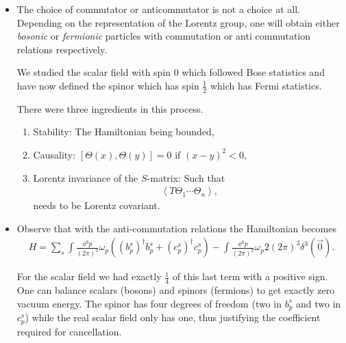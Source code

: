 \begin{itemize}
    \item The choice of commutator or anticommutator is not a choice at all. Depending on the representation of the Lorentz group, one will obtain either \textit{bosonic} or \textit{fermionic} particles with commutation or anti commutation relations respectively.

        We studied the scalar field with spin $0$ which followed Bose statistics and have now defined the spinor which has spin $\frac{1}{2}$ which has Fermi statistics.
        
        There were three ingredients in this process.
        \begin{enumerate}[label=\alph*)]
            \item Stability: The Hamiltonian being bounded,
            \item Causality: $\left[ \Theta \left( x \right) , \Theta \left( y \right)   \right] = 0$ if $\left( x- y \right)^2 < 0$,
            \item Lorentz invariance of the $S$-matrix: Such that 
                \begin{align}
                    \left<T \Theta_1 \cdots \Theta_n \right>
                ,\end{align}
                needs to be Lorentz covariant.
        \end{enumerate}
    \item Observe that with the anti-commutation relations the Hamiltonian becomes
        \begin{align}
            H = \sum_{s}^{} \int \frac{\dd{^3p}}{\left( 2\pi\right)^3} \omega_p \left( \left( b_p^{s} \right)^{\dag} b_p^{s} + \left( c_p^{s} \right)^{\dag} c^{s}_p \right)  - \int \frac{\dd{^3p}}{\left( 2\pi\right)^3} \omega_p 2 \left( 2\pi \right)^3 \delta^{3}\left( \vec{0} \right) 
        .\end{align}

        For the scalar field we had exactly $\frac{1}{4}$ of this last term with a positive sign. One can balance scalars (bosons) and spinors (fermions) to get exactly zero vacuum energy. The spinor has four degrees of freedom (two in $b^{s}_p$ and two in $c^{s}_p$) while the real scalar field only has one, thus justifying the coefficient required for cancellation.
\end{itemize}




